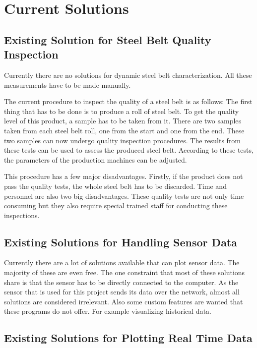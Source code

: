 \section{Current Solutions}

\subsection{Existing Solution for Steel Belt Quality Inspection}

Currently there are no solutions for dynamic steel belt characterization. All these measurements have to be made manually.

The current procedure to inspect the quality of a steel belt is as follows: The first thing that has to be done is to produce a roll of steel belt. To get the quality level of this product, a sample has to be taken from it. There are two samples taken from each steel belt roll, one from the start and one from the end. These two samples can now undergo quality inspection procedures. The results from these tests can be used to assess the produced steel belt. According to these tests, the parameters of the production machines can be adjusted.

This procedure has a few major disadvantages. Firstly, if the product does not pass the quality tests, the whole steel belt has to be discarded. Time and personnel are also two big disadvantages. These quality tests are not only time consuming but they also require special trained staff for conducting these inspections.

\subsection{Existing Solutions for Handling Sensor Data}

Currently there are a lot of solutions available that can plot sensor data. The majority of these are even free. The one constraint that most of these solutions share is that the sensor has to be directly connected to the computer. As the sensor that is used for this project sends its data over the network, almost all solutions are considered irrelevant. Also some custom features are wanted that these programs do not offer. For example visualizing historical data.

\subsection{Existing Solutions for Plotting Real Time Data}

